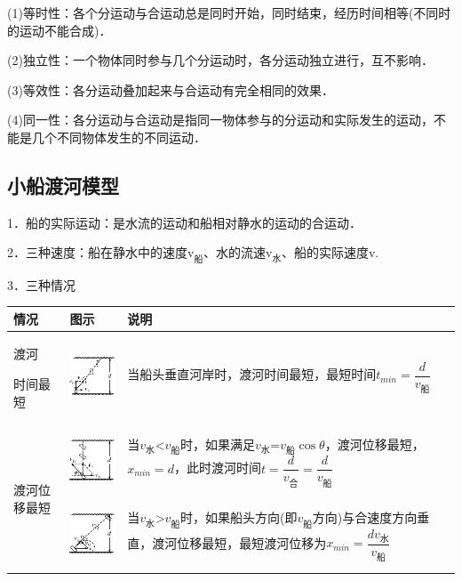 \documentclass[cn,10.5pt,chinese,mac,chinesefont=founder]{elegantbook}
\begin{document}
(1)等时性：各个分运动与合运动总是同时开始，同时结束，经历时间相等(不同时的运动不能合成)．

(2)独立性：一个物体同时参与几个分运动时，各分运动独立进行，互不影响．

(3)等效性：各分运动叠加起来与合运动有完全相同的效果．

(4)同一性：各分运动与合运动是指同一物体参与的分运动和实际发生的运动，不能是几个不同物体发生的不同运动．


\newpage
\subsection{小船渡河模型}

1．船的实际运动：是水流的运动和船相对静水的运动的合运动．

2．三种速度：船在静水中的速度$\mathrm v_{\text{船}}$、水的流速$\mathrm v_{\text{水}}$、船的实际速度v.

3．三种情况

\begin{longtable}[]{@{}m{0.8cm}m{2.5cm}m{10cm}@{}}
\toprule
情况 & 图示 & 说明\tabularnewline
\midrule
\endhead

渡河

时间最短
&
\includegraphics[width=0.90625in,height=0.76042in]{media/image146.png}
&
当船头垂直河岸时，渡河时间最短，最短时间$t_{min}=\dfrac{d}{v_{\text{船}}}$
\tabularnewline
\multirow{2}{0.8cm}{渡河位移最短}
&
\includegraphics[width=0.85417in,height=0.76042in]{media/image147.png}
&
当$v_{\text{水}}$\textless $v_{\text{船}}$时，如果满足$v_{\text{水}}$=$v_{\text{船}}\cos
\theta$，渡河位移最短，$x_{min}=d$，此时渡河时间$t=\dfrac{d}{v_{\text{合}}}=\dfrac{d}{v_{\text{船}}}$
\tabularnewline
&
\includegraphics[width=0.85417in,height=0.76042in]{media/image148.png}
&
当$v_{\text{水}}$\textgreater $v_{\text{船}}$时，如果船头方向(即$v_{\text{船}}$方向)与合速度方向垂直，渡河位移最短，最短渡河位移为$x_{min}=\dfrac{dv_{\text{水}}}{v_{\text{船}}}$\tabularnewline
\bottomrule
\end{longtable}
\end{document}
